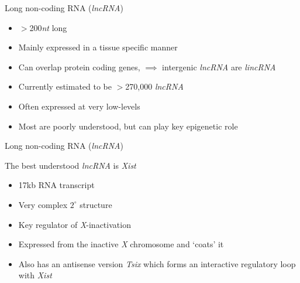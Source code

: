 \documentclass[aspectratio=169,11pt]{beamer}
\begin{document}
\begin{frame}{Long non-coding RNA (\textit{lncRNA})}

	\begin{itemize}
		\item $>$200\textit{nt} long
		\item Mainly expressed in a tissue specific manner
		\item Can overlap protein coding genes, $\implies$ intergenic \textit{lncRNA} are \textit{lincRNA}
		\item Currently estimated to be $>$270,000 \textit{lncRNA}
		\item Often expressed at very low-levels
		\item Most are poorly understood, but can play key epigenetic role
	\end{itemize}
	

\end{frame}

\begin{frame}{Long non-coding RNA (\textit{lncRNA})}

The best understood \textit{lncRNA} is \textit{Xist}

	\begin{itemize}
		\item 17kb RNA transcript
		\item Very complex $2^{\circ}$ structure
		\item Key regulator of \textit{X}-inactivation
		\item Expressed from the inactive \textit{X} chromosome and `coats' it
		\item Also has an antisense version \textit{Tsix} which forms an interactive regulatory loop with \textit{Xist}
	\end{itemize}
	
\end{frame}
\end{document}
